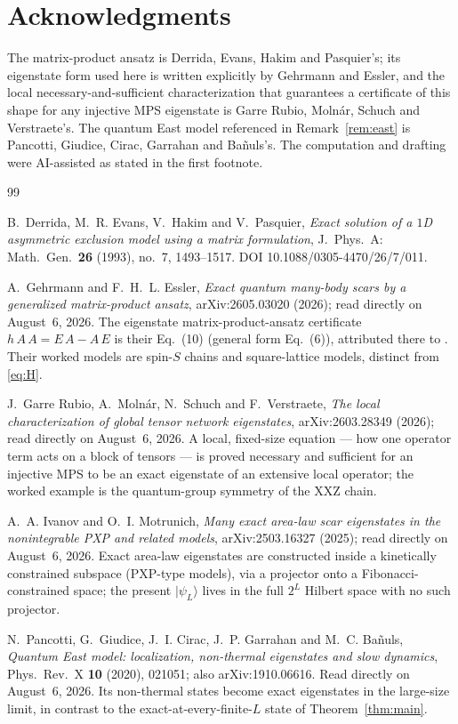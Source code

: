 \documentclass[11pt]{amsart}
\newcommand{\ket}[1]{\lvert #1 \rangle}
\newcommand{\psiL}{\ket{\psi_L}}
\theoremstyle{plain}
\theoremstyle{definition}
\theoremstyle{remark}
\begin{document}
\section*{Acknowledgments}

The matrix-product ansatz is Derrida, Evans, Hakim and Pasquier's; its
eigenstate form used here is written explicitly by Gehrmann and Essler, and
the local necessary-and-sufficient characterization that guarantees a
certificate of this shape for any injective MPS eigenstate is Garre Rubio,
Moln\'ar, Schuch and Verstraete's. The quantum East model referenced in
Remark~\ref{rem:east} is Pancotti, Giudice, Cirac, Garrahan and Ba\~nuls's.
The computation and drafting were AI-assisted as stated in the first
footnote.

\begin{thebibliography}{99}

B.~Derrida, M.~R. Evans, V.~Hakim and V.~Pasquier,
\emph{Exact solution of a $1$D asymmetric exclusion model using a matrix
formulation},
J.~Phys.~A: Math.\ Gen.\ \textbf{26} (1993), no.~7, 1493--1517.
DOI 10.1088/0305-4470/26/7/011.

A.~Gehrmann and F.~H.~L. Essler,
\emph{Exact quantum many-body scars by a generalized matrix-product ansatz},
arXiv:2605.03020 (2026); read directly on August~6, 2026. The eigenstate
matrix-product-ansatz certificate $h\,A\,A=E\,A-A\,E$ is their Eq.~(10)
(general form Eq.~(6)), attributed there to \cite{DEHP93}. Their worked
models are spin-$S$ chains and square-lattice models, distinct from
\eqref{eq:H}.

J.~Garre Rubio, A.~Moln\'ar, N.~Schuch and F.~Verstraete,
\emph{The local characterization of global tensor network eigenstates},
arXiv:2603.28349 (2026); read directly on August~6, 2026. A local,
fixed-size equation --- how one operator term acts on a block of tensors ---
is proved necessary and sufficient for an injective MPS to be an exact
eigenstate of an extensive local operator; the worked example is the
quantum-group symmetry of the XXZ chain.

A.~A. Ivanov and O.~I. Motrunich,
\emph{Many exact area-law scar eigenstates in the nonintegrable PXP and
related models}, arXiv:2503.16327 (2025); read directly on August~6, 2026.
Exact area-law
eigenstates are constructed inside a kinetically constrained subspace
(PXP-type models), via a projector onto a Fibonacci-constrained space; the
present $\psiL$ lives in the full $2^L$ Hilbert space with no such
projector.

N.~Pancotti, G.~Giudice, J.~I. Cirac, J.~P. Garrahan and M.~C. Ba\~nuls,
\emph{Quantum East model: localization, non-thermal eigenstates and slow
dynamics}, Phys.\ Rev.\ X \textbf{10} (2020), 021051;
also arXiv:1910.06616. Read directly on August~6, 2026. Its non-thermal
states become exact eigenstates in the large-size limit, in contrast to the
exact-at-every-finite-$L$ state of Theorem~\ref{thm:main}.

\end{thebibliography}
\end{document}
